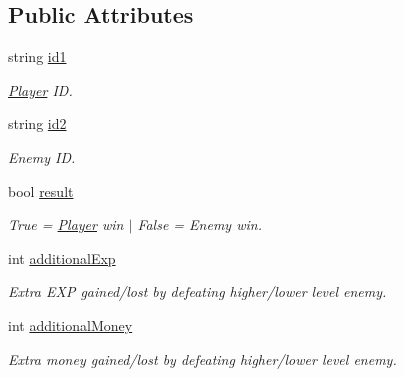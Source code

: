 \subsection*{Public Attributes}
\begin{DoxyCompactItemize}
\item 
string \mbox{\hyperlink{class_battle_result_a350ad6a31cf445647adc770788444832}{id1}}
\begin{DoxyCompactList}\small\item\em \mbox{\hyperlink{class_player}{Player}} ID. \end{DoxyCompactList}\item 
string \mbox{\hyperlink{class_battle_result_ae2c787e74297c842bf4e284f0cc612fb}{id2}}
\begin{DoxyCompactList}\small\item\em Enemy ID. \end{DoxyCompactList}\item 
bool \mbox{\hyperlink{class_battle_result_afd1e0eda93aa975e42f89c2eb3ce0fdc}{result}}
\begin{DoxyCompactList}\small\item\em True = \mbox{\hyperlink{class_player}{Player}} win $\vert$ False = Enemy win. \end{DoxyCompactList}\item 
int \mbox{\hyperlink{class_battle_result_afc0db86910169071de1574e338681970}{additional\+Exp}}
\begin{DoxyCompactList}\small\item\em Extra E\+XP gained/lost by defeating higher/lower level enemy. \end{DoxyCompactList}\item 
int \mbox{\hyperlink{class_battle_result_a41b75012dae886cb26753404c5ff9dcd}{additional\+Money}}
\begin{DoxyCompactList}\small\item\em Extra money gained/lost by defeating higher/lower level enemy. \end{DoxyCompactList}\end{DoxyCompactItemize}
